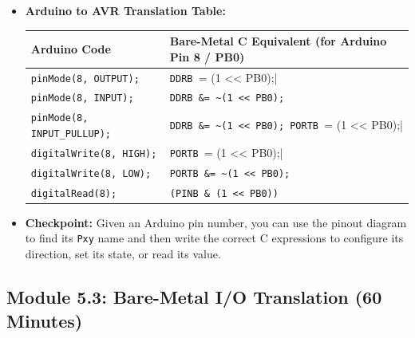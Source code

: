 \documentclass[11pt,a4paper]{article}
\begin{document}
\begin{itemize}
\begin{itemize}
    \end{itemize}
    \item \textbf{Arduino to AVR Translation Table:}
    \begin{center}
    \begin{tabular}{ll}
    \toprule
    \textbf{Arduino Code} & \textbf{Bare-Metal C Equivalent (for Arduino Pin 8 / PB0)} \\
    \midrule
    \verb|pinMode(8, OUTPUT);| & \verb|DDRB |= (1 << PB0);| \\
    \verb|pinMode(8, INPUT);| & \verb|DDRB &= ~(1 << PB0);| \\
    \verb|pinMode(8, INPUT_PULLUP);| & \verb|DDRB &= ~(1 << PB0); PORTB |= (1 << PB0);| \\
    \verb|digitalWrite(8, HIGH);| & \verb|PORTB |= (1 << PB0);| \\
    \verb|digitalWrite(8, LOW);| & \verb|PORTB &= ~(1 << PB0);| \\
    \verb|digitalRead(8);| & \verb|(PINB & (1 << PB0))| \\
    \bottomrule
    \end{tabular}
    \end{center}
    \item \textbf{Checkpoint:} Given an Arduino pin number, you can use the pinout diagram to find its \verb|Pxy| name and then write the correct C expressions to configure its direction, set its state, or read its value.
\end{itemize}
\newpage
\subsection*{Module 5.3: Bare-Metal I/O Translation (60 Minutes)}
\end{document}
